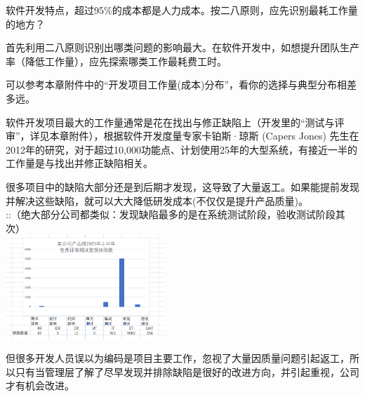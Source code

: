 软件开发特点，超过95\%的成本都是人力成本。按二八原则，应先识别最耗工作量的地方？

首先利用二八原则识别出哪类问题的影响最大。在软件开发中，如想提升团队生产率（降低工作量），应先探索哪类工作最耗费工时。


可以参考本章附件中的“开发项目工作量(成本)分布”，看你的选择与典型分布相差多远。

软件开发项目最大的工作量通常是花在找出与修正缺陷上（开发里的“测试与评审”，详见本章附件），根据软件开发度量专家卡铂斯·琼斯 (Capers Jones) 先生在2012年的研究，对于超过10,000功能点、计划使用25年的大型系统，有接近一半的工作量是与找出并修正缺陷相关。

很多项目中的缺陷大部分还是到后期才发现，这导致了大量返工。如果能提前发现并解决这些缺陷，就可以大大降低研发成本(不仅仅是提升产品质量)。\\
::（绝大部分公司都类似：发现缺陷最多的是在系统测试阶段，验收测试阶段其次）\\


\includegraphics[width=6cm]{微信截图_20231023085822.png}


但很多开发人员误以为编码是项目主要工作，忽视了大量因质量问题引起返工，所以只有当管理层了解了尽早发现并排除缺陷是很好的改进方向，并引起重视，公司才有机会改进。

